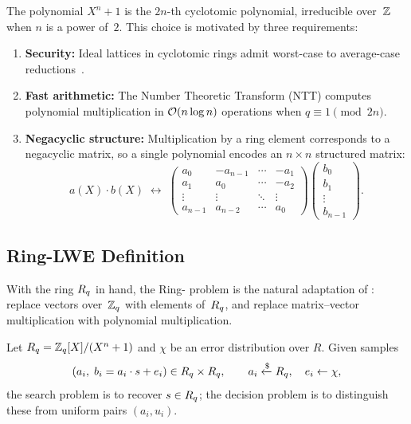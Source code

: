 The polynomial $X^n + 1$ is the $2n$-th cyclotomic polynomial, irreducible over~$\mathbb{Z}$ when $n$ is a power of~$2$.  This choice is motivated by three requirements:
\begin{enumerate}
\item \textbf{Security:} Ideal lattices in cyclotomic rings admit worst-case to average-case reductions~\cite{LPR2010}.
\item \textbf{Fast arithmetic:} The Number Theoretic Transform (NTT) computes polynomial multiplication in $\mathcal{O}(n \log n)$ operations when $q \equiv 1 \pmod{2n}$.
\item \textbf{Negacyclic structure:} Multiplication by a ring element corresponds to a negacyclic matrix, so a single polynomial encodes an $n\times n$ structured matrix:
\begin{equation}
\label{eq:negacyclic}
a(X)\cdot b(X) \;\longleftrightarrow\;
\begin{pmatrix}
a_0 & -a_{n-1} & \cdots & -a_1 \\
a_1 & a_0 & \cdots & -a_2 \\
\vdots & \vdots & \ddots & \vdots \\
a_{n-1} & a_{n-2} & \cdots & a_0
\end{pmatrix}
\begin{pmatrix} b_0 \\ b_1 \\ \vdots \\ b_{n-1} \end{pmatrix}.
\end{equation}
\end{enumerate}


\subsection{Ring-LWE Definition}
\label{subsec:rlwe-def}

With the ring $R_q$ in hand, the Ring-\lwe{} problem is the natural adaptation of \lwe{}: replace vectors over~$\mathbb{Z}_q$ with elements of~$R_q$, and replace matrix--vector multiplication with polynomial multiplication.

\begin{definition}
\label{def:rlwe}
Let $R_q = \mathbb{Z}_q[X]/(X^n+1)$ and $\chi$ be an error distribution over $R$.
Given samples
\begin{equation}
(a_i,\; b_i = a_i\cdot s + e_i) \in \Rq \times \Rq, \qquad a_i \getsr \Rq,\quad e_i \leftarrow \chi,
\end{equation}
the search problem is to recover $s \in R_q$; the decision problem is to distinguish these from uniform pairs $(a_i, u_i)$.
\end{definition}

